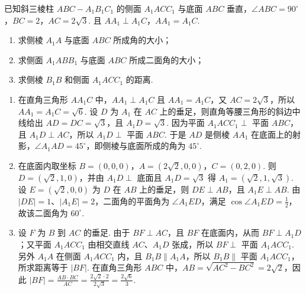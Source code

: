 \begin{problem}
已知斜三棱柱 \(ABC - A_{1}B_{1}C_{1}\) 的侧面 \(A_{1}ACC_{1}\) 与底面 \(ABC\) 垂直，\(\angle ABC = 90^{\circ}\)，\(BC = 2\)，\(AC = 2\sqrt{3}\). 且 \(AA_{1} \perp A_{1}C\)，\(AA_{1} = A_{1}C\).

\begin{enumerate}
\item 求侧棱 \(A_{1}A\) 与底面 \(ABC\) 所成角的大小；
\item 求侧面 \(A_{1}ABB_{1}\) 与底面 \(ABC\) 所成二面角的大小；
\item 求侧棱 \(B_{1}B\) 和侧面 \(A_{1}ACC_{1}\) 的距离.
\end{enumerate}

\end{problem}

\begin{solution}
\begin{enumerate}
\item 在直角三角形 \(AA_1C\) 中，\(AA_1\perp A_1C\) 且 \(AA_1=A_1C\)，又 \(AC=2\sqrt{3}\)，所以 \(AA_1=A_1C=\sqrt{6}\). 设 \(D\) 为 \(A_1\) 在 \(AC\) 上的垂足，则直角等腰三角形的斜边中线给出 \(AD=DC=\sqrt{3}\)，且 \(A_1D=\sqrt{3}\). 因为平面 \(A_1ACC_1\perp\) 平面 \(ABC\)，且 \(A_1D\perp AC\)，所以 \(A_1D\perp\) 平面 \(ABC\). 于是 \(AD\) 是侧棱 \(AA_1\) 在底面上的射影，\(\angle A_1AD=45^{\circ}\)，即侧棱与底面所成的角为 \(45^{\circ}\).
\item 在底面内取坐标 \(B=(0,0,0)\)，\(A=(2\sqrt{2},0,0)\)，\(C=(0,2,0)\). 则 \(D=(\sqrt{2},1,0)\)，并由 \(A_1D\perp\) 底面且 \(A_1D=\sqrt{3}\) 得 \(A_1=(\sqrt{2},1,\sqrt{3})\). 设 \(E=(\sqrt{2},0,0)\) 为 \(D\) 在 \(AB\) 上的垂足，则 \(DE\perp AB\)，且 \(A_1E\perp AB\). 由 \(|DE|=1\)、\(|A_1E|=2\)，二面角的平面角为 \(\angle A_1ED\)，满足 \(\cos\angle A_1ED=\frac{1}{2}\)，故该二面角为 \(60^{\circ}\).
\item 设 \(F\) 为 \(B\) 到 \(AC\) 的垂足. 由于 \(BF\perp AC\)，且 \(BF\) 在底面内，从而 \(BF\perp A_1D\)；又平面 \(A_1ACC_1\) 由相交直线 \(AC\)、\(A_1D\) 张成，所以 \(BF\perp\) 平面 \(A_1ACC_1\). 另外 \(A_1A\) 在侧面 \(A_1ACC_1\) 内，且 \(B_1B\parallel A_1A\)，所以 \(B_1B\parallel\) 平面 \(A_1ACC_1\)，所求距离等于 \(|BF|\). 在直角三角形 \(ABC\) 中，\(AB=\sqrt{AC^2-BC^2}=2\sqrt{2}\)，因此 \(|BF|=\frac{AB\cdot BC}{AC}=\frac{2\sqrt{2}\cdot2}{2\sqrt{3}}=\frac{2\sqrt{6}}{3}\).
\end{enumerate}
\end{solution}


